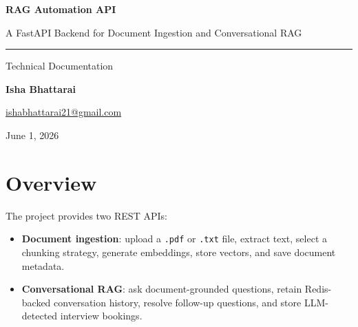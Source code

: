 \documentclass[12pt, a4paper]{article}
\begin{document}
\begin{titlepage}
    \centering
    \vspace*{3cm}

    {\Huge\bfseries\color{primary}RAG Automation API\par}
    \vspace{0.6cm}
    {\Large\color{accent}A FastAPI Backend for Document Ingestion and Conversational RAG\par}
    \vspace{1.5cm}
    \rule{0.7\linewidth}{0.5pt}\par
    \vspace{1cm}
    {\large Technical Documentation\par}
    \vspace{2cm}

    {\large\textbf{Isha Bhattarai}\par}
    \vspace{0.3cm}
    {\normalsize\href{mailto:ishabhattarai21@gmail.com}{ishabhattarai21@gmail.com}\par}

    \vfill
    {\normalsize June 1, 2026\par}
\end{titlepage}

\begin{abstract}
RAG Automation API is a modular FastAPI backend for document ingestion and
retrieval-augmented generation. It accepts PDF and TXT documents, extracts and
chunks their text using a selectable strategy, generates local BGE embeddings,
and stores vectors in Qdrant. The conversational API retrieves relevant context
without using \texttt{RetrievalQAChain}, preserves multi-turn chat history in
Redis, and uses an LLM to detect and persist interview bookings in PostgreSQL.
\end{abstract}

\tableofcontents
\newpage

\section{Overview}

The project provides two REST APIs:

\begin{itemize}[leftmargin=1.5em]
    \item \textbf{Document ingestion}: upload a \texttt{.pdf} or \texttt{.txt}
    file, extract text, select a chunking strategy, generate embeddings, store
    vectors, and save document metadata.
    \item \textbf{Conversational RAG}: ask document-grounded questions, retain
    Redis-backed conversation history, resolve follow-up questions, and store
    LLM-detected interview bookings.
\end{itemize}
\end{document}
